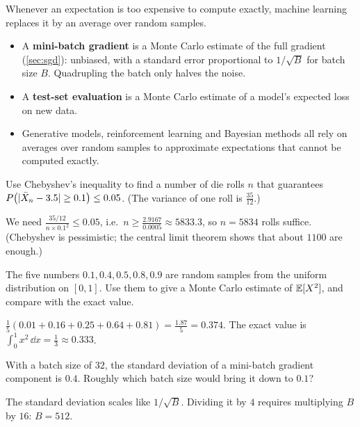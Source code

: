 \begin{mlnote}
Whenever an expectation is too expensive to compute exactly, machine learning
replaces it by an average over random samples.
\begin{itemize}
  \item A \textbf{mini-batch gradient} is a Monte Carlo estimate of the full
    gradient (\cref{sec:sgd}): unbiased, with a standard error proportional to
    $1/\sqrt B$ for batch size $B$. Quadrupling the batch only halves the noise.
  \item A \textbf{test-set evaluation} is a Monte Carlo estimate of a model's
    expected loss on new data.
  \item Generative models, reinforcement learning and Bayesian methods all rely
    on averages over random samples to approximate expectations that cannot be
    computed exactly.
\end{itemize}
\end{mlnote}

\sectionexercises

\begin{exercise}
Use Chebyshev's inequality to find a number of die rolls $n$ that guarantees
$P\bigl(\lvert\bar X_n - 3.5\rvert \ge 0.1\bigr) \le 0.05$. (The variance of one roll
is $\tfrac{35}{12}$.)
\end{exercise}
\begin{solution}
We need $\tfrac{35/12}{n\times0.1^2} \le 0.05$, i.e.\ $n \ge \tfrac{2.9167}{0.0005}
\approx 5833.3$, so $n = 5834$ rolls suffice. (Chebyshev is pessimistic; the
central limit theorem shows that about $1100$ are enough.)
\end{solution}

\begin{exercise}
The five numbers $0.1, 0.4, 0.5, 0.8, 0.9$ are random samples from the uniform
distribution on $[0, 1]$. Use them to give a Monte Carlo estimate of $\mathbb{E}[X^2]$,
and compare with the exact value.
\end{exercise}
\begin{solution}
$\tfrac15(0.01 + 0.16 + 0.25 + 0.64 + 0.81) = \tfrac{1.87}{5} = 0.374$. The exact
value is $\int_0^1x^2\,\dd x = \tfrac13 \approx 0.333$.
\end{solution}

\begin{exercise}
With a batch size of $32$, the standard deviation of a mini-batch gradient
component is $0.4$. Roughly which batch size would bring it down to $0.1$?
\end{exercise}
\begin{solution}
The standard deviation scales like $1/\sqrt B$. Dividing it by $4$ requires
multiplying $B$ by $16$: $B = 512$.
\end{solution}

